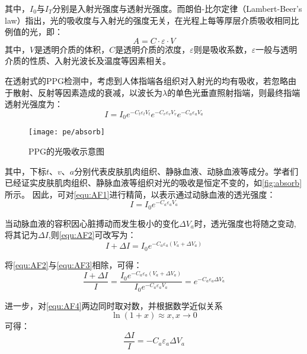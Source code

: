 其中，$I_{0}$与$I_{T}$分别是入射光强度与透射光强度。而朗伯-比尔定律（Lambert-Beer's law）指出，光的吸收度与入射光的强度无关，在光程上每等厚层介质吸收相同比例值的光，即：
\begin{equation}
    \label{equ:LBL2}
    A=C \cdot \varepsilon \cdot V
\end{equation}
其中，$V$是透明介质的体积，$C$是透明介质的浓度，$\varepsilon$则是吸收系数，$\varepsilon$一般与透明介质的性质、入射光波长及温度等因素相关。

在透射式的PPG检测中，考虑到人体指端各组织对入射光的均有吸收，若忽略由于散射、反射等因素造成的衰减，以波长为$\lambda$的单色光垂直照射指端，则最终指端透射光强度为\cite{4122392}：
\begin{equation}
    \label{equ:AF1}
    I=I_{0}e^{-C_{t}\varepsilon _{t}V_{t}}e^{-C_{v}\varepsilon _{v}V_{v}} e^{-C_{a}\varepsilon _{a}V_{a}} 
\end{equation}

\begin{figure}[htbp]
    \centering
    \texttt{[image: pe/absorb]}
    \caption{\label{fig:absorb}PPG的光吸收示意图}
\end{figure}

其中，下标$t$、$v$、$a$分别代表皮肤肌肉组织、静脉血液、动脉血液等成分。学者们已经证实皮肤肌肉组织、静脉血液等组织对光的吸收是恒定不变的\cite{1980Spectrophotometric,4122392}，如\autoref{fig:absorb}所示。
因此，可对\autoref{equ:AF1}进行精简，以表示通过动脉血液的透光强度\cite{PPGYY}：
\begin{equation}
    \label{equ:AF2}
    I=I_{0}e^{-C_{a}\varepsilon _{a}V_{a}} 
\end{equation}

当动脉血液的容积因心脏搏动而发生极小的变化$\Delta V_{a}$时，透光强度也将随之变动,将其记为$\Delta I$,则\autoref{equ:AF2}可改写为：
\begin{equation}
    \label{equ:AF3}
    I+\Delta I=I_{0}e^{-C_{a}\varepsilon _{a}(V_{a}+\Delta V_{a})} 
\end{equation}

将\autoref{equ:AF2}与\autoref{equ:AF3}相除，可得：
\begin{equation}
    \label{equ:AF4}
    \frac{I+\Delta I}{I}=\frac{I_{0}e^{-C_{a}\varepsilon _{a}(V_{a}+\Delta V_{a})}}{I_{0}e^{-C_{a}\varepsilon _{a}V_{a}}}=e^{-C_{a}\varepsilon _{a}\Delta V_{a}} 
\end{equation}

进一步，对\autoref{equ:AF4}两边同时取对数，并根据数学近似关系
\begin{equation}
    \label{equ:lnx}
    \ln(1+x)\approx x,x\rightarrow 0
\end{equation}
可得：
\begin{equation}
    \label{equ:AF5}
    \frac{\Delta I}{I}=-C_{a}\varepsilon _{a}\Delta V_{a}
\end{equation}

